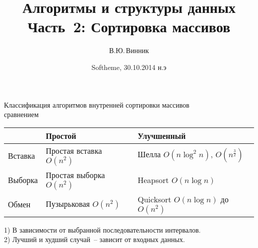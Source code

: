 \documentclass[landscape]{slides}
\begin{document}
\author{В.Ю.\,Винник}

\title{Алгоритмы и структуры данных\\
Часть~2: Сортировка массивов}

\date{Softheme, 30.10.2014 н.э}

\maketitle

\begin{slide}
  Классификация алгоритмов внутренней сортировки массивов\\сравнением
  \begin{center}
    \renewcommand{\arraystretch}{2}
    \begin{tabular}{|l|l|l|}
      \hline
      {}&
      Простой&
      Улучшенный
      \\
      \hline
      Вставка&
      Простая вставка $O(n^2)$&
      Шелла\textonesuperior{} $O(n\log^2n)$, $O(n^\frac{3}{2})$
      \\
      \hline
      Выборка&
      Простая выборка $O(n^2)$&
      Heapsort $O(n\log n)$
      \\
      \hline
      Обмен&
      Пузырьковая $O(n^2)$&
      Quicksort\texttwosuperior{} $O(n\log n)$ до $O(n^2)$
      \\
      \hline
    \end{tabular}
  \end{center}
  1) В зависимости от выбранной последовательности интервалов.\\
  2) Лучший и худший случай~-- зависит от входных данных.
\end{slide}
\end{document}
